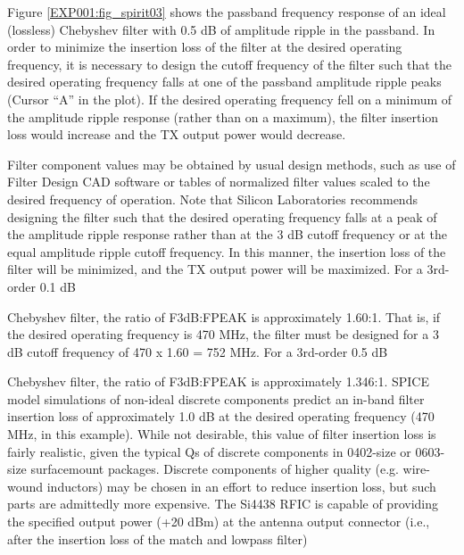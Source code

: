         Figure \ref{EXP001:fig_spirit03} shows the passband frequency response of an ideal 
        (lossless) Chebyshev filter with 0.5 dB of amplitude ripple in the passband. In order to 
        minimize the insertion loss of the filter at the desired operating frequency, it is 
        necessary to design the cutoff frequency of the filter such that the desired operating 
        frequency falls at one of the  passband amplitude ripple peaks (Cursor “A” in the plot). If 
        the desired operating frequency fell on a minimum of the amplitude ripple response (rather 
        than on a maximum), the filter insertion loss would increase and the TX output power would 
        decrease.
        
        Filter component values may be obtained by usual design methods, such as use of Filter 
        Design CAD software or tables of normalized filter values scaled to the desired frequency 
        of operation. Note that Silicon Laboratories recommends designing the filter such that the 
        desired operating frequency falls at a peak of the amplitude ripple response rather than at 
        the 3 dB cutoff frequency or at the equal amplitude ripple cutoff frequency. In this 
        manner, the insertion loss of the filter will be minimized, and the TX output power will be 
        maximized. For a 3rd-order 0.1 dB
        
        Chebyshev filter, the ratio of F3dB:FPEAK is approximately 1.60:1. That is, if the desired 
        operating frequency is 470 MHz, the filter must be designed for a 3 dB cutoff frequency of 
        470 x 1.60 = 752 MHz. For a 3rd-order 0.5 dB
        
        Chebyshev filter, the ratio of F3dB:FPEAK is approximately 1.346:1. SPICE model simulations 
        of non-ideal discrete components predict an in-band filter insertion loss of approximately 
        1.0 dB at the desired operating frequency (470 MHz, in this example). While not desirable, 
        this value of filter insertion loss is fairly realistic, given the typical Qs of discrete 
        components in 0402-size or 0603-size surfacemount packages. Discrete components of higher 
        quality (e.g. wire-wound inductors) may be chosen in an effort to reduce insertion loss, 
        but such parts are admittedly more expensive. The Si4438 RFIC is capable of providing the 
        specified output power (+20 dBm) at the antenna output connector (i.e., after the insertion 
        loss of the match and lowpass filter)
        
